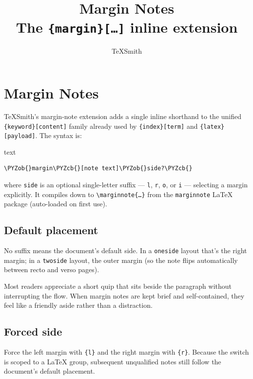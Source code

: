 \documentclass[a4paper,twoside]{article}
\title{Margin Notes\\[0.5em]\large The \texttt{\{margin\}[…]} inline extension}
\author{TeXSmith}\date{}
\begin{document}
\maketitle

\section{Margin Notes}\label{margin-notes}

TeXSmith's margin-note extension adds a single inline shorthand to the
unified \texttt{\{keyword\}[content]} family already used by \texttt{\{index\}[term]} and
\texttt{\{latex\}[payload]}. The syntax is:

\begin{code}{text}{}{}
\begin{Verbatim}[commandchars=\\\{\},breaklines, breakanywhere, commandchars=\\\{\}]
\PYZob{}margin\PYZcb{}[note text]\PYZob{}side?\PYZcb{}
\end{Verbatim}
\end{code}
where \texttt{side} is an optional single-letter suffix --- \texttt{l}, \texttt{r}, \texttt{o}, or \texttt{i} ---
selecting a margin explicitly. It compiles down to \texttt{\textbackslash{}marginnote\{…\}} from the
\texttt{marginnote} \LaTeX{} package (auto-loaded on first use).

\subsection{Default placement}\label{default-placement}

No suffix means the document's default side. In a \texttt{oneside} layout that's
the right margin; in a \texttt{twoside} layout, the outer margin (so the note
flips automatically between recto and verso pages).

Most readers appreciate a short quip that sits
beside the paragraph without interrupting the flow. When margin notes are
kept brief and self-contained, they feel like a friendly aside rather than
a distraction.

\subsection{Forced side}\label{forced-side}

Force the left margin with \texttt{\{l\}} and the right margin with \texttt{\{r\}}. Because
the switch is scoped to a \LaTeX{} group, subsequent unqualified notes still
follow the document's default placement.
\end{document}
